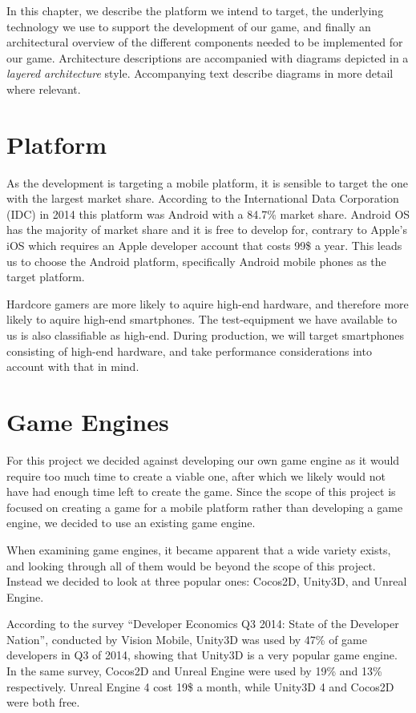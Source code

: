 In this chapter, we describe the platform we intend to target, the underlying
technology we use to support the development of our game, and finally an
architectural overview of the different components needed to be implemented for
our game. Architecture descriptions are accompanied with diagrams depicted in a
\textit{layered architecture} style. Accompanying text describe diagrams in
more detail where relevant.

\section{Platform}
As the development is targeting a mobile platform, it is sensible to target the one with the largest market share.
According to the International Data Corporation (IDC) in 2014 this platform was Android with a 84.7\% market share\cite{marketshare}.
Android OS has the majority of market share and it is free to develop
for, contrary to Apple's iOS which requires an Apple developer account that
costs 99\$ a year\cite{appledevprogram}.
This leads us to choose the Android platform, specifically Android mobile
phones as the target platform.

Hardcore gamers are more likely to aquire high-end hardware, and therefore more likely to aquire high-end smartphones.
The test-equipment we have available to us is also classifiable as high-end.
During production, we will target smartphones consisting of high-end hardware, and take performance considerations into account with that in mind.

\section{Game Engines}
For this project we decided against developing our own game engine as it would require too much time to create a viable one, after which we likely would not have had enough time left to create the game. 
Since the scope of this project is focused on creating a game for a mobile platform rather than developing a game engine, we decided to use an existing game engine.

When examining game engines, it became apparent that a wide variety exists, and looking through all of them would be beyond the scope of this project.
Instead we decided to look at three popular ones: Cocos2D, Unity3D, and Unreal Engine.

According to the survey ``Developer Economics Q3 2014: State of the Developer Nation''\cite{visionmobile-survey}, conducted by Vision Mobile\cite{visionmobile}, Unity3D was used by 47\% of game developers in Q3 of 2014, showing that Unity3D is a very popular game engine. 
In the same survey, Cocos2D and Unreal Engine were used by 19\% and 13\% respectively.
Unreal Engine 4 cost 19\$ a month\cite{unrealFree}, while Unity3D 4 and Cocos2D were both free.


